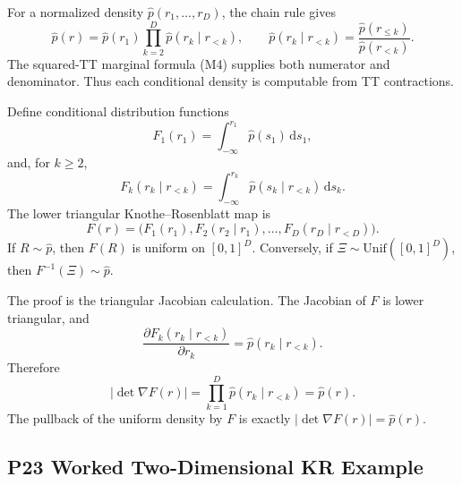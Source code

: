 \documentclass[11pt]{article}
\newcommand{\dd}{\,\mathrm d}
\begin{document}
For a normalized density \(\widehat p(r_1,\ldots,r_D)\), the chain rule gives
\[
    \widehat p(r)
    =
    \widehat p(r_1)
    \prod_{k=2}^D
    \widehat p(r_k\mid r_{<k}),
    \qquad
    \widehat p(r_k\mid r_{<k})
    =
    \frac{\widehat p(r_{\le k})}{\widehat p(r_{<k})}.
    \tag{K1}
\]
The squared-TT marginal formula (M4) supplies both numerator and denominator.
Thus each conditional density is computable from TT contractions.

Define conditional distribution functions
\[
    F_1(r_1)=\int_{-\infty}^{r_1}\widehat p(s_1)\dd s_1,
    \tag{K2}
\]
and, for \(k\ge2\),
\[
    F_k(r_k\mid r_{<k})
    =
    \int_{-\infty}^{r_k}
    \widehat p(s_k\mid r_{<k})\dd s_k.
    \tag{K3}
\]
The lower triangular Knothe--Rosenblatt map is
\[
    F(r)
    =
    \bigl(
    F_1(r_1),
    F_2(r_2\mid r_1),
    \ldots,
    F_D(r_D\mid r_{<D})
    \bigr).
    \tag{K4}
\]
If \(R\sim\widehat p\), then \(F(R)\) is uniform on \([0,1]^D\).  Conversely, if
\(\Xi\sim \mathrm{Unif}([0,1]^D)\), then \(F^{-1}(\Xi)\sim\widehat p\).

The proof is the triangular Jacobian calculation.  The Jacobian of \(F\) is
lower triangular, and
\[
    \frac{\partial F_k(r_k\mid r_{<k})}{\partial r_k}
    =
    \widehat p(r_k\mid r_{<k}).
\]
Therefore
\[
    |\det\nabla F(r)|
    =
    \prod_{k=1}^D \widehat p(r_k\mid r_{<k})
    =
    \widehat p(r).
    \tag{K5}
\]
The pullback of the uniform density by \(F\) is exactly
\(|\det\nabla F(r)|=\widehat p(r)\).

\subsection*{P23 Worked Two-Dimensional KR Example}
\end{document}
